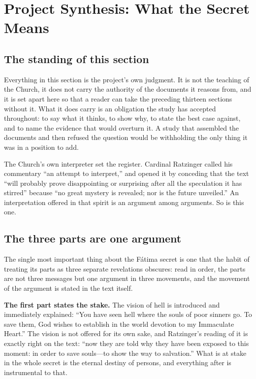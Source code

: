 \sectionguard
\section{Project Synthesis: What the Secret Means}\label{sec:synthesis}

\subsection{The standing of this section}

Everything in this section is the project's own judgment. It is not
the teaching of the Church, it does not carry the authority of the
documents it reasons from, and it is set apart here so that a reader
can take the preceding thirteen sections without it. What it does
carry is an obligation the study has accepted throughout: to say what
it thinks, to show why, to state the best case against, and to name
the evidence that would overturn it. A study that assembled the
documents and then refused the question would be withholding the only
thing it was in a position to add.

The Church's own interpreter set the register. Cardinal Ratzinger
called his commentary ``an attempt to interpret,'' and opened it by
conceding that the text ``will probably prove disappointing or
surprising after all the speculation it has stirred'' because ``no
great mystery is revealed; nor is the future unveiled.'' An
interpretation offered in that spirit is an argument among arguments.
So is this one.

\subsection{The three parts are one argument}

The single most important thing about the F\'atima secret is one that
the habit of treating its parts as three separate revelations
obscures: read in order, the parts are not three messages but one
argument in three movements, and the movement of the argument is
stated in the text itself.

\textbf{The first part states the stake.} The vision of hell is
introduced and immediately explained: ``You have seen hell where the
souls of poor sinners go. To save them, God wishes to establish in
the world devotion to my Immaculate Heart.'' The vision is not
offered for its own sake, and Ratzinger's reading of it is exactly
right on the text: ``now they are told why they have been exposed to
this moment: in order to save souls---to show the way to
salvation.'' What is at stake in the whole secret is the eternal
destiny of persons, and everything after is instrumental to that.

